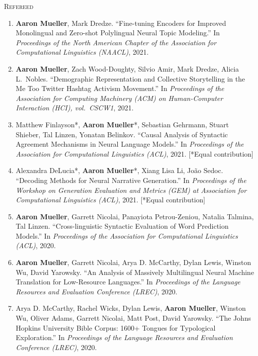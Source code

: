 \documentclass[10pt]{article}
\begin{document}
	\textsc{Refereed}
	\begin{enumerate}[leftmargin=*, topsep=0pt, itemsep=-1ex, partopsep=0ex, parsep=1ex]
	\item \textbf{Aaron Mueller}, Mark Dredze. ``Fine-tuning Encoders for Improved Monolingual and Zero-shot Polylingual Neural Topic Modeling.'' In \emph{Proceedings of the North American Chapter of the Association for Computational Linguistics (NAACL)}, 2021.  
	
	\item \textbf{Aaron Mueller}, Zach Wood-Doughty, Silvio Amir, Mark Dredze, Alicia L.\ Nobles. ``Demographic Representation and Collective Storytelling in the Me Too Twitter Hashtag Activism Movement.'' In \emph{Proceedings of the Association for Computing Machinery (ACM) on Human-Computer Interaction (HCI), vol.\ CSCW1}, 2021.

	\item Matthew Finlayson*, \textbf{Aaron Mueller}*, Sebastian Gehrmann, Stuart Shieber, Tal Linzen, Yonatan Belinkov. ``Causal Analysis of Syntactic Agreement Mechanisms in Neural Language Models.'' In \emph{Proceedings of the Association for Computational Linguistics (ACL)}, 2021. [*Equal contribution]
	
	\item Alexandra DeLucia*, \textbf{Aaron Mueller}*, Xiang Lisa Li, João Sedoc. ``Decoding Methods for Neural Narrative Generation.'' In \emph{Proceedings of the Workshop on Generation Evaluation and Metrics (GEM) at Association for Computational Linguistics (ACL)}, 2021. [*Equal contribution]

	\item \textbf{Aaron Mueller}, Garrett Nicolai, Panayiota Petrou-Zeniou, Natalia Talmina, Tal Linzen. ``Cross-linguistic Syntactic Evaluation of Word Prediction Models.'' In \emph{Proceedings of the Association for Computational Linguistics (ACL)}, 2020.

	\item \textbf{Aaron Mueller}, Garrett Nicolai, Arya D. McCarthy, Dylan Lewis, Winston Wu, David Yarowsky. ``An Analysis of Massively Multilingual Neural Machine Translation for Low-Resource Languages.'' In \emph{Proceedings of the Language Resources and Evaluation Conference (LREC)}, 2020.

	\item Arya D. McCarthy, Rachel Wicks, Dylan Lewis, \textbf{Aaron Mueller}, Winston Wu, Oliver Adams, Garrett Nicolai, Matt Post, David Yarowsky. ``The Johns Hopkins University Bible Corpus: 1600+ Tongues for Typological Exploration.'' In \emph{Proceedings of the Language Resources and Evaluation Conference (LREC)}, 2020.


\end{enumerate}
\end{document}
